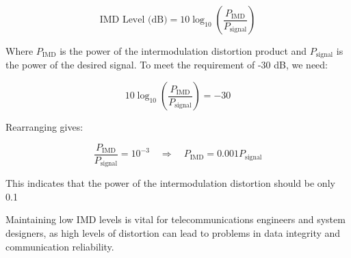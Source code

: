 \[
\text{IMD Level (dB)} = 10 \log_{10}\left(\frac{P_{\text{IMD}}}{P_{\text{signal}}}\right)
\]

Where \( P_{\text{IMD}} \) is the power of the intermodulation distortion product and \( P_{\text{signal}} \) is the power of the desired signal. To meet the requirement of -30 dB, we need:

\[
10 \log_{10}\left(\frac{P_{\text{IMD}}}{P_{\text{signal}}}\right) = -30
\]

Rearranging gives:

\[
\frac{P_{\text{IMD}}}{P_{\text{signal}}} = 10^{-3} \quad \Rightarrow \quad P_{\text{IMD}} = 0.001 P_{\text{signal}}
\]

This indicates that the power of the intermodulation distortion should be only 0.1%

Maintaining low IMD levels is vital for telecommunications engineers and system designers, as high levels of distortion can lead to problems in data integrity and communication reliability.

